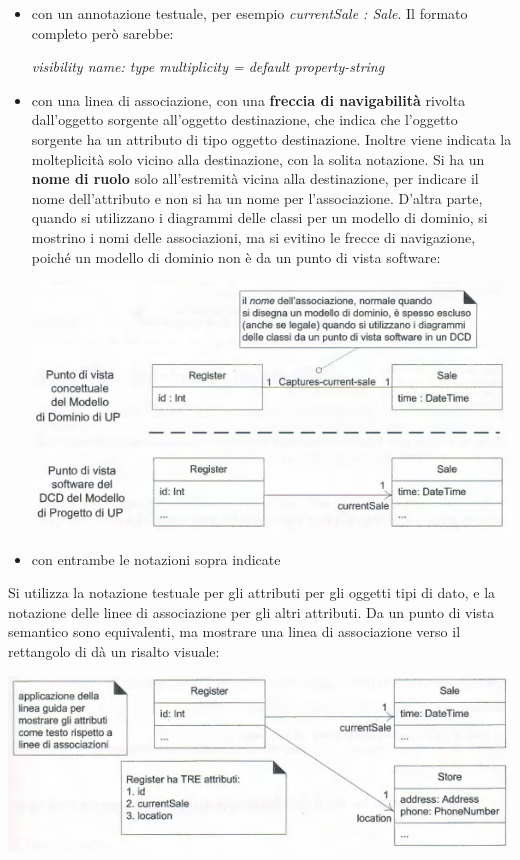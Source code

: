 \documentclass[a4paper,12pt, oneside]{book}
\begin{document}
\begin{itemize}
	\item con un annotazione testuale, per esempio \textit{currentSale : Sale}. Il formato completo però sarebbe:
	\begin{center}
		\textit{visibility name: type multiplicity = default {property-string}}
	\end{center}
	\item con una linea di associazione, con una \textbf{freccia di navigabilità} rivolta dall'oggetto sorgente  all'oggetto destinazione, che indica che l'oggetto sorgente ha un attributo di tipo oggetto destinazione. Inoltre viene indicata la molteplicità solo vicino alla destinazione, con la solita notazione. Si ha un \textbf{nome di ruolo} solo all'estremità vicina alla destinazione, per indicare il nome dell'attributo e non si ha un nome per l'associazione. D'altra parte, quando si utilizzano i diagrammi delle classi per un modello di dominio, si mostrino i nomi delle associazioni, ma si evitino le frecce di navigazione, poiché un modello di dominio non è da un punto di vista software:
	\begin{center}
		\includegraphics[scale=0.7]{img/clasd4.png}
	\end{center}
	\item con entrambe le notazioni sopra indicate
\end{itemize}
Si utilizza la notazione testuale per gli attributi per gli oggetti tipi di dato,
e la notazione delle linee di associazione per gli altri attributi. 
\newpage
Da un punto di vista semantico sono equivalenti, ma mostrare una linea di associazione verso il rettangolo di dà un risalto visuale:
\begin{center}
	\includegraphics[scale=0.7]{img/clasd5.png}
\end{center}
\end{document}
